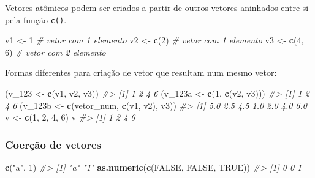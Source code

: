 \documentclass[]{book}
\newenvironment{Shaded}{\begin{snugshade}}{\end{snugshade}}
\newcommand{\KeywordTok}[1]{\textcolor[rgb]{0.13,0.29,0.53}{\textbf{#1}}}
\newcommand{\DecValTok}[1]{\textcolor[rgb]{0.00,0.00,0.81}{#1}}
\newcommand{\StringTok}[1]{\textcolor[rgb]{0.31,0.60,0.02}{#1}}
\newcommand{\CommentTok}[1]{\textcolor[rgb]{0.56,0.35,0.01}{\textit{#1}}}
\newcommand{\OtherTok}[1]{\textcolor[rgb]{0.56,0.35,0.01}{#1}}
\newcommand{\NormalTok}[1]{#1}
\begin{document}
Vetores atômicos podem ser criados a partir de outros vetores aninhados
entre si pela função \texttt{c()}.

\begin{Shaded}
\begin{Highlighting}[]
\NormalTok{v1 <-}\StringTok{ }\DecValTok{1} \CommentTok{# vetor com 1 elemento}
\NormalTok{v2 <-}\StringTok{ }\KeywordTok{c}\NormalTok{(}\DecValTok{2}\NormalTok{) }\CommentTok{# vetor com 1 elemento}
\NormalTok{v3 <-}\StringTok{ }\KeywordTok{c}\NormalTok{(}\DecValTok{4}\NormalTok{, }\DecValTok{6}\NormalTok{) }\CommentTok{# vetor com 2 elemento}
\end{Highlighting}
\end{Shaded}

Formas diferentes para criação de vetor que resultam num mesmo vetor:

\begin{Shaded}
\begin{Highlighting}[]
\NormalTok{(v_}\DecValTok{123}\NormalTok{ <-}\StringTok{ }\KeywordTok{c}\NormalTok{(v1, v2, v3))}
\CommentTok{#> [1] 1 2 4 6}
\NormalTok{(v_123a <-}\StringTok{ }\KeywordTok{c}\NormalTok{(}\DecValTok{1}\NormalTok{, }\KeywordTok{c}\NormalTok{(v2, v3)))}
\CommentTok{#> [1] 1 2 4 6}
\NormalTok{(v_123b <-}\StringTok{ }\KeywordTok{c}\NormalTok{(vetor_num, }\KeywordTok{c}\NormalTok{(v1, v2), v3))}
\CommentTok{#> [1] 5.0 2.5 4.5 1.0 2.0 4.0 6.0}
\NormalTok{v <-}\StringTok{ }\KeywordTok{c}\NormalTok{(}\DecValTok{1}\NormalTok{, }\DecValTok{2}\NormalTok{, }\DecValTok{4}\NormalTok{, }\DecValTok{6}\NormalTok{)}
\NormalTok{v}
\CommentTok{#> [1] 1 2 4 6}
\end{Highlighting}
\end{Shaded}

\subsubsection{Coerção de vetores}\label{coercao-de-vetores}

\begin{Shaded}
\begin{Highlighting}[]
\KeywordTok{c}\NormalTok{(}\StringTok{"a"}\NormalTok{, }\DecValTok{1}\NormalTok{)}
\CommentTok{#> [1] "a" "1"}
\KeywordTok{as.numeric}\NormalTok{(}\KeywordTok{c}\NormalTok{(}\OtherTok{FALSE}\NormalTok{, }\OtherTok{FALSE}\NormalTok{, }\OtherTok{TRUE}\NormalTok{))}
\CommentTok{#> [1] 0 0 1}
\end{Highlighting}
\end{Shaded}
\end{document}

